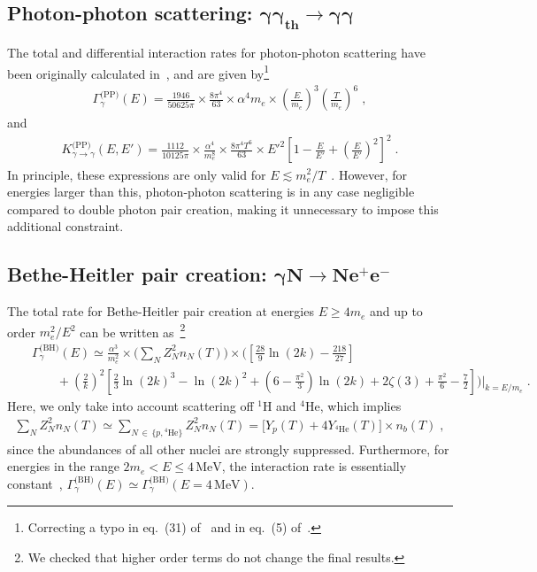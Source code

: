 \documentclass[11pt,a4paper]{article}
\newcommand{\eqsp}{\;}
\newcommand{\e}{\,}
\begin{document}
\subsection*{Photon-photon scattering: $\boldsymbol{\gamma \gamma_\text{th} \rightarrow \gamma \gamma}$}
The total and differential interaction rates for photon-photon scattering have been originally calculated in~\cite{Svensson:1990pfo}, and are given by\footnote{Correcting a typo in eq.~(31) of~\cite{Kawasaki:1994sc} and in eq.~(5) of~\cite{Poulin:2015opa}.}
\begin{align}
\Gamma_{\gamma}^{\text{(PP)}}(E) = \frac{1946}{50625\pi}\times \frac{8\pi^4}{63}\times \alpha^4 m_e \times \left( \frac{E}{m_e} \right)^3 \left( \frac{T}{m_e} \right)^6 \eqsp,
\end{align}
and
\begin{align}
K_{\gamma \rightarrow \gamma}^\text{(PP)}(E, E') = \frac{1112}{10125\pi}\times\frac{\alpha^4}{m_e^8}\times \frac{8\pi^4T^6}{63} \times E'^2\left[ 1 - \frac{E}{E'} + \left( \frac{E}{E'} \right)^2 \right]^2 \eqsp.
\end{align}
In principle, these expressions are only valid for $E \lesssim m_e^2/T$~\cite{Kawasaki:1994sc}. However, for energies larger than this, photon-photon scattering is in any case negligible compared to double photon pair creation, making it unnecessary to impose this additional constraint.

\subsection*{Bethe-Heitler pair creation: $\boldsymbol{\gamma N \rightarrow N e^+ e^-}$}
The total rate for Bethe-Heitler pair creation at energies $E \geq 4m_e$ and up to order $m_e^2/E^2$ can be written as~\cite{Maximon:1968, Kawasaki:1994sc}\footnote{We checked that higher order terms do not change the final results.}
\begin{eqnarray}
&&\Gamma_{\gamma}^{\text{(BH)}}(E) \simeq \frac{\alpha^3}{m_e^2} \times \Bigg( \sum_N Z_N^2 n_N(T) \Bigg) \times \Bigg( \left[ \frac{28}{9}\ln(2k) -\frac{218}{27} \right] \nonumber \\
&& \qquad+ \left(\frac{2}{k}\right)^2 \left[ \frac{2}{3}\ln(2k)^3 - \ln(2k)^2 + \left( 6 - \frac{\pi^2}{3} \right)\ln(2k) + 2\zeta(3) + \frac{\pi^2}{6} - \frac{7}{2}\right]\Bigg)\Bigg|_{k=E/m_e} \eqsp.
\end{eqnarray}
Here, we only take into account scattering off $^1\mathrm{H}$ and $^4\mathrm{He}$, which implies
\begin{align}
\sum_{N} Z_N^2 n_N(T) \simeq \sum_{N\,\in\,\{p, {}^4\text{He} \}} Z_N^2 n_N(T) = \big[Y_{p}(T) + 4 Y_{{}^4\text{He}}(T)\big] \times n_b(T)\eqsp,
\end{align}
since the abundances of all other nuclei are strongly suppressed. Furthermore, for energies in the range $2m_e < E \leq 4\e\mathrm{MeV}$, the interaction rate is essentially constant~\cite{Jedamzik:2006xz}, $\Gamma_{\gamma}^{\text{(BH)}}(E) \simeq \Gamma_{\gamma}^{\text{(BH)}}(E = 4\e\mathrm{MeV})$.
\end{document}
